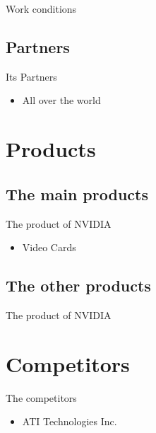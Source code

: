 \documentclass{beamer}
\begin{document}
\begin{frame}{Work conditions}
\end{frame}
\subsection{Partners}
\begin{frame}{Its Partners}
	\begin{block}{}
		\begin{itemize}
			\item<+->{All over the world}
		\end{itemize}
	\end{block}
\end{frame}

\section{Products}
\subsection{The main products}
\begin{frame}{The product of NVIDIA}
	\transdissolve[duration=0.1]
	\begin{block}{}
		\begin{itemize}
			\item<+->{Video Cards}
		\end{itemize}
	\end{block}
\end{frame}

\subsection{The other products}
\begin{frame}{The product of NVIDIA}
	\transdissolve[duration=0.1]
\end{frame}

\section{Competitors}
\begin{frame}{The competitors}
	\transdissolve[duration=0.1]
	\begin{block}{}
		\begin{itemize}
			\item<+->{ATI Technologies Inc.}
		\end{itemize}
	\end{block}
\end{frame}
\end{document}
